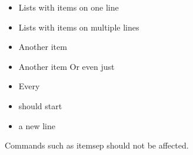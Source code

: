\documentclass{article}
\begin{document}
\begin{itemize}

  \item Lists with items on one line

  \item Lists with items
    on multiple lines

  \item Another item

  \item Another item
    Or even just %

  \item Every
  \item should start
  \item a new line

\end{itemize}

Commands such as itemsep should not be affected.
\setlength{\itemsep}{0pt}
\end{document}
